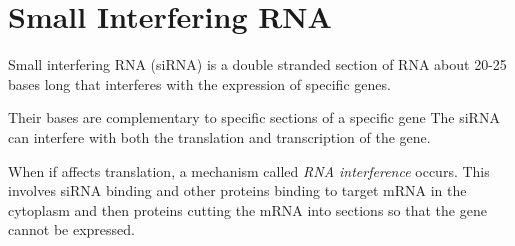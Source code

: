 \documentclass{article}
\begin{document}
\newpage

\section*{Small Interfering RNA}

Small interfering RNA (siRNA) is a double stranded section of RNA about 20-25
bases long that interferes with the expression of specific genes.

Their bases are complementary to specific sections of a specific gene The siRNA
can interfere with both the translation and transcription of the gene.

When if affects translation, a mechanism called {\it RNA interference} occurs.
This involves siRNA binding and other proteins binding to target mRNA in the
cytoplasm and then proteins cutting the mRNA into sections so that the gene
cannot be expressed.
\end{document}
